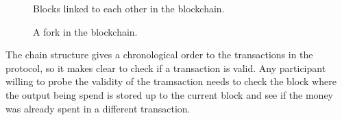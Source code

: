 \begin{figure}
	\centering
	\def\svgwidth{\columnwidth}
	
	\caption{Blocks linked to each other in the blockchain.}
	\label{fig:block_links}
\end{figure}

\begin{figure}
	\centering
	\def\svgwidth{\columnwidth}
	
	\caption{A fork in the blockchain.}
	\label{fig:chain_fork}
\end{figure}

The chain structure gives a chronological order to the transactions in the
  protocol, so it makes clear to check if a transaction is valid.
Any participant willing to probe the validity of the tramsaction needs
  to check the block where the output being spend is stored up to the
  current block and see if the money was already spent in a different
  transaction.






